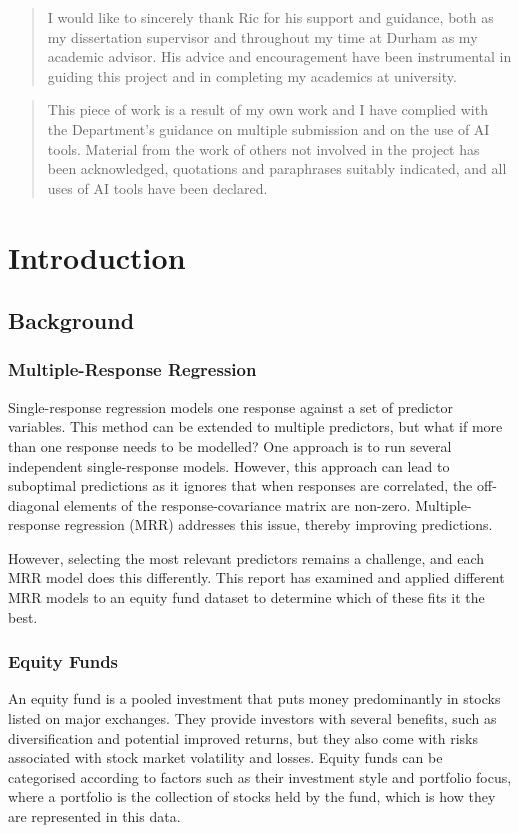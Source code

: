 \documentclass[11pt]{report} %
\renewcommand{\abstractname}{Acknowledgement} %
\begin{document}
\begin{abstract}
I would like to sincerely thank Ric for his support and guidance, both as my dissertation supervisor and throughout my time at Durham as my academic advisor. His advice and encouragement have been instrumental in guiding this project and in completing my academics at university. 
\end{abstract}

\renewcommand{\abstractname}{Declaration} %

\begin{abstract}
This piece of work is a result of my own work and I have complied with the Department’s guidance on multiple submission and on the use of AI tools. Material from the work of others not involved in the project has been acknowledged, quotations and paraphrases suitably indicated, and all uses of AI tools have been declared.
\end{abstract}


\tableofcontents

\chapter{Introduction}
\section{Background}
\subsection{Multiple-Response Regression}
Single-response regression models one response against a set of predictor variables. This method can be extended to multiple predictors, but what if more than one response needs to be modelled? One approach is to run several independent single-response models. However, this approach can lead to suboptimal predictions as it ignores that when responses are correlated, the off-diagonal elements of the response-covariance matrix are non-zero. Multiple-response regression (MRR) addresses this issue, thereby improving predictions. 

However, selecting the most relevant predictors remains a challenge, and each MRR model does this differently. This report has examined and applied different MRR models to an equity fund dataset to determine which of these fits it the best.

\subsection{Equity Funds}
An equity fund is a pooled investment that puts money predominantly in stocks listed on major exchanges.\cite{Chen2024EquityFunds}
They provide investors with several benefits, such as diversification and potential improved returns, but they also come with risks associated with stock market volatility and losses.\cite{Chen2024EquityFunds}
Equity funds can be categorised according to factors such as their investment style and portfolio focus, where a portfolio is the collection of stocks held by the fund, which is how they are represented in this data.\cite{Chen2024EquityFunds}
\end{document}
